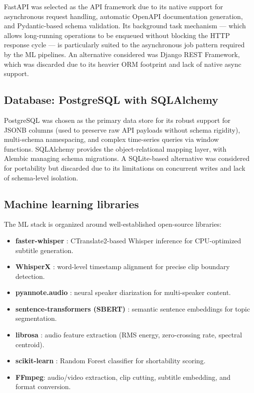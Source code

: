 \documentclass[ENG]{TFUOC}
\begin{document}
FastAPI \cite{fastapi_ref} was selected as the API framework due to its native support for asynchronous request handling, automatic OpenAPI documentation generation, and Pydantic-based schema validation. Its background task mechanism — which allows long-running operations to be enqueued without blocking the HTTP response cycle — is particularly suited to the asynchronous job pattern required by the ML pipelines. An alternative considered was Django REST Framework, which was discarded due to its heavier ORM footprint and lack of native async support.

\subsection*{Database: PostgreSQL with SQLAlchemy}

PostgreSQL was chosen as the primary data store for its robust support for JSONB columns (used to preserve raw API payloads without schema rigidity), multi-schema namespacing, and complex time-series queries via window functions. SQLAlchemy \cite{sqlalchemy_ref} provides the object-relational mapping layer, with Alembic managing schema migrations. A SQLite-based alternative was considered for portability but discarded due to its limitations on concurrent writes and lack of schema-level isolation.

\subsection*{Machine learning libraries}

The ML stack is organized around well-established open-source libraries:
\begin{itemize}
    \item \textbf{faster-whisper} \cite{fasterwhisper}: CTranslate2-based Whisper inference for CPU-optimized subtitle generation.
    \item \textbf{WhisperX} \cite{bain2023whisperx}: word-level timestamp alignment for precise clip boundary detection.
    \item \textbf{pyannote.audio} \cite{bredin2021pyannote}: neural speaker diarization for multi-speaker content.
    \item \textbf{sentence-transformers (SBERT)} \cite{reimers2019sbert}: semantic sentence embeddings for topic segmentation.
    \item \textbf{librosa} \cite{mcfee2015librosa}: audio feature extraction (RMS energy, zero-crossing rate, spectral centroid).
    \item \textbf{scikit-learn} \cite{breiman2001rf}: Random Forest classifier for shortability scoring.
    \item \textbf{FFmpeg}: audio/video extraction, clip cutting, subtitle embedding, and format conversion.
\end{itemize}
\end{document}
